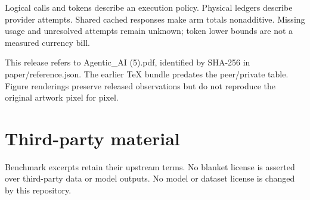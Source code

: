 \documentclass[11pt]{article}
\begin{document}
Logical calls and tokens describe an execution policy. Physical ledgers describe provider attempts. Shared cached responses make arm totals nonadditive. Missing usage and unresolved attempts remain unknown; token lower bounds are not a measured currency bill.

This release refers to Agentic\_AI (5).pdf, identified by SHA-256 in paper/reference.json. The earlier TeX bundle predates the peer/private table. Figure renderings preserve released observations but do not reproduce the original artwork pixel for pixel.

\section*{Third-party material}

Benchmark excerpts retain their upstream terms. No blanket license is asserted over third-party data or model outputs. No model or dataset license is changed by this repository.
\end{document}
